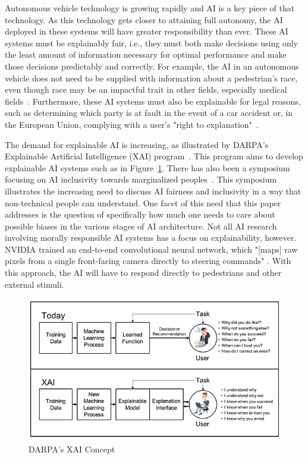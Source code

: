 \documentclass[]{report}
\begin{document}
Autonomous vehicle technology is growing rapidly and AI is a key piece of that technology. As this
technology gets closer to attaining full autonomy, the AI deployed in these systems will have
greater responsibility than ever. These AI systems must be explainably fair, i.e., they must both
make decisions using only the least amount of information necessary for optimal performance and make
those decisions predictably and correctly. For example, the AI in an autonomous vehicle does not
need to be supplied with information about a pedestrian's race, even though race may be an impactful
trait in other fields, especially medical fields~\cite{sickeCellDisease}. Furthermore, these AI
systems must also be explainable for legal reasons, such as determining which party is at fault in
the event of a car accident or, in the European Union, complying with a user's "right to
explanation"~\cite{goodman2017european}.

The demand for explainable AI is increasing, as illustrated by DARPA's Explainable Artificial
Intelligence (XAI) program~\cite{gunning2016explainable}. This program aims to develop explainable
AI systems such as in Figure~\ref{fig:darpa_xai}. There has also been a symposium focusing on AI
inclusivity towards marginalized peoples~\cite{berkmanKleinCenterAI2017,aiAndInclusionSymposium}.
This symposium illustrates the increasing need to discuss AI fairness and inclusivity in a way that
non-technical people can understand. One facet of this need that this paper addresses is the
question of specifically how much one needs to care about possible biases in the various stages of
AI architecture. Not all AI research involving morally responsible AI systems has a focus on
explainability, however. NVIDIA trained an end-to-end convolutional neural network, which "[maps]
raw pixels from a single front-facing camera directly to steering commands" \cite{bojarski2016end}.
With this approach, the AI will have to respond directly to pedestrians and other external stimuli.

\begin{figure}[h]
    \centering
    \includegraphics[scale=1.1]{figures/xai-figure2.png}
    \caption[]{DARPA's XAI Concept~\protect\cite{gunningXAIProgram}}
    \label{fig:darpa_xai}
\end{figure}
\end{document}
